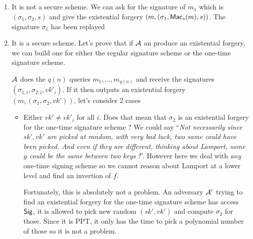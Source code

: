 \subsection{}
\begin{solution}
  \begin{enumerate}
    \item
      It is not a secure scheme.
      We can ask for the signature of $m_1$ which is $(\sigma_1, \sigma_2, s)$ and give the existential forgery
      $(m, (\sigma_1, \operatorname{\mathsf{Mac}}_s(m), s))$.
      The signature $\sigma_1$ has been replayed
    \item
      It is a secure scheme.
      Let's prove that if $\mathcal{A}$ an produce an existential forgery,
      we can build one for either the regular signature scheme or the one-time signature scheme.

      $\mathcal{A}$ does the $q(n)$ queries $m_1, \ldots, m_{q(n)}$ and receive the signatures $(\sigma_{1;i}, \sigma_{2;i}, {vk'}_i)$.
      If it then outputs an existential forgery $(m, (\sigma_1, \sigma_2, vk'))$, let's consider 2 cases
      \begin{itemize}
        \item
          Either $vk' \neq {vk'}_i$ for all $i$.
          Does that mean that $\sigma_2$ is an existential forgery for the one-time signature scheme ?
          We could say ``\emph{Not necessarily since $sk',vk'$ are picked at random, with very bad luck, two same could have been picked.
          And even if they are different, thinking about Lamport, some $y$ could be the same between two keys !}''.
          However here we deal with \emph{any} one-time signing scheme so we cannot reason about Lamport at a lower level and find an invertion of $f$.

          Fortunately, this is absolutely not a problem.
          An adversary $\mathcal{A}'$ trying to find an existential forgery for the one-time signature scheme has access $\operatorname{\mathsf{Sig}}$,
          it is allowed to pick new random $(sk', vk')$ and compute $\sigma_2$ for those.
          Since it is PPT, it only has the time to pick a polynomial number of those so it is not a problem.


\end{itemize}
\end{enumerate}
\end{solution}
